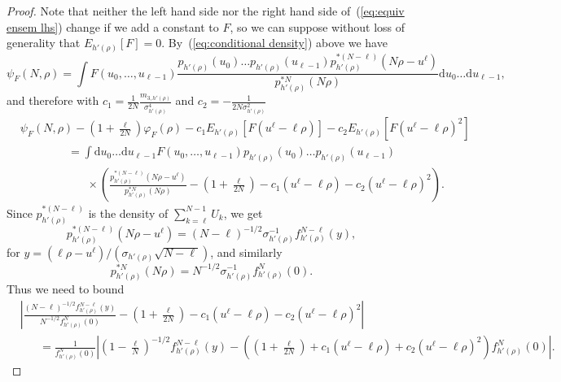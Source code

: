 \documentclass[11pt, a4paper]{article}
\newcommand{\mathd}{\mathrm{d}}
\newcommand{\nocomma}{}
\newcommand{\1}{\mathbf{1}}
\begin{document}
\begin{proof}
  Note that neither the left hand side nor the right hand side of~(\ref{eq:equiv ensem lhs}) change
  if we add a constant to $F$, so we can suppose without loss of generality
  that $E_{h' (\rho)} [F] = 0$. By~(\ref{eq:conditional density}) above we
  have
  \[ \psi_F (N, \rho) = \int F (u_0, \ldots, u_{\ell - 1}) \frac{p_{h' (\rho)}
     (u_0) \ldots p_{h' (\rho)} (u_{\ell - 1}) p^{\ast (N - \ell)}_{h' (\rho)}
     (N \rho - u^{\ell})}{p_{h' (\rho)}^{\ast N} (N \rho)} \mathd u_0 \ldots
     \mathd u_{\ell - 1}, \]
  and therefore with $c_1 = \frac{1}{2 N} \frac{m_{3, h' (\rho)}}{\sigma^4_{h'
  (\rho)}}$ and $c_2 = - \frac{1}{2 N \sigma_{h' (\rho)}^2}$
  \begin{align*}
     &\psi_F (N, \rho) - \left( 1 + \frac{\ell}{2 N} \right) \varphi_F (\rho) -
     c_1 E_{h' (\rho)} [F (u^{\ell} - \ell \rho)] - c_2 E_{h' (\rho)} [F
     (u^{\ell} - \ell \rho)^2] \\
     & \hspace{50pt} = \int \mathd u_0 \ldots \mathd u_{\ell - 1} F (u_0, \ldots, u_{\ell -
     1}) p_{h' (\rho)} (u_0) \ldots p_{h' (\rho)} (u_{\ell - 1}) \\
     & \hspace{70pt} \times \left( \frac{p^{\ast (N - \ell)}_{h' (\rho)} (N \rho - u^{\ell})}{p_{h' (\rho)}^{\ast N} (N \rho)} - \left( 1 + \frac{\ell}{2 N} \right) - c_1 (u^{\ell} - \ell \rho) - c_2 (u^{\ell} - \ell \rho)^2 \right).
  \end{align*}
  Since $p^{\ast
  (N - \ell)}_{h' (\rho)}$ is the density of $\sum_{k = \ell}^{N - 1} U_k
  \nocomma$, we get
  \[ p^{\ast (N - \ell)}_{h' (\rho)} (N \rho - u^{\ell}) = (N - \ell)^{- 1 /
     2} \sigma_{h' (\rho)}^{- 1} f^{N - \ell}_{h' (\rho)} (y), \]
  for $y = (\ell \rho - u^{\ell}) / \left( \sigma_{h' (\rho)} \sqrt{N - \ell}
  \right)$, and similarly
  \[ p_{h' (\rho)}^{\ast N} (N \rho) = N^{- 1 / 2} \sigma_{h' (\rho)}^{- 1}
     f^N_{h' (\rho)} (0) . \]
  Thus we need to bound
  \begin{align*}
     & \left| \frac{(N - \ell)^{- 1 / 2} f^{N - \ell}_{h' (\rho)} (y)}{N^{- 1 /  2} f^N_{h' (\rho)} (0)} - \left( 1 + \frac{\ell}{2 N} \right) - c_1  (u^{\ell} - \ell \rho) - c_2 (u^{\ell} - \ell \rho)^2 \right| \\
     & \hspace{20pt} = \frac{1}{f^N_{h' (\rho)} (0)} \left| \left( 1 - \frac{\ell}{N} \right)^{- 1 / 2} f^{N - \ell}_{h' (\rho)} (y) - \left( \left( 1 +
     \frac{\ell}{2 N} \right) + c_1 (u^{\ell} - \ell \rho) + c_2 (u^{\ell} -  \ell \rho)^2 \right) f^N_{h' (\rho)} (0) \right| .

\end{align*}
\end{proof}
\end{document}
